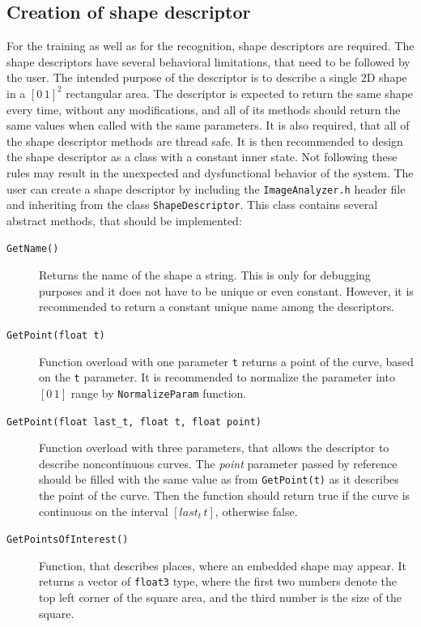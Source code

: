 \begin{description}
\begin{description}
\subsection{Creation of shape descriptor}
For the training as well as for the recognition, shape descriptors are required. The shape descriptors have several behavioral limitations, that need to be followed by the user. The intended purpose of the descriptor is to describe a single 2D shape in a $[0\,1]^2$ rectangular area. The descriptor is expected to return the same shape every time, without any modifications, and all of its methods should return the same values when called with the same parameters. It is also required, that all of the shape descriptor methods are thread safe. It is then recommended to design the shape descriptor as a class with a constant inner state. Not following these rules may result in the unexpected and dysfunctional behavior of the system. The user can create a shape descriptor by including the \texttt{ImageAnalyzer.h} header file and inheriting from the class \texttt{ShapeDescriptor}. This class contains several abstract methods, that should be implemented:
\begin{description}
\item[\texttt{GetName()}] Returns the name of the shape a string. This is only for debugging purposes and it does not have to be unique or even constant. However, it is recommended to return a constant unique name among the descriptors.

\item[\texttt{GetPoint(\texttt{float} t)}] Function overload with one parameter \texttt{t} returns a point of the curve, based on the \texttt{t} parameter. It is recommended to normalize the parameter into $[0\,1]$ range by \texttt{NormalizeParam} function.

\item[\texttt{GetPoint(\texttt{float} last_t, \texttt{float} t, \texttt{float} point)}] Function overload with three parameters, that allows the descriptor to describe noncontinuous curves. The \emph{point} parameter passed by reference should be filled with the same value as from \texttt{GetPoint(t)} as it describes the point of the curve. Then the function should return true if the curve is continuous on the interval $[last_t\, t]$, otherwise false.

\item[\texttt{GetPointsOfInterest()}] Function, that describes places, where an embedded shape may appear. It returns a vector of \texttt{float3} type, where the first two numbers denote the top left corner of the square area, and the third number is the size of the square.
\end{description}


\end{description}
\end{description}

